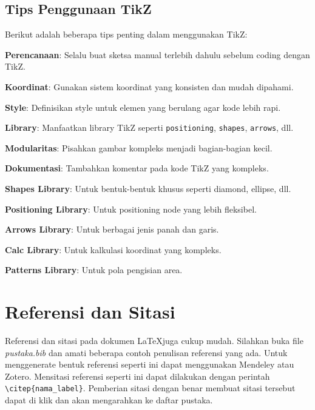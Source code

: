 \subsection{Tips Penggunaan TikZ}
Berikut adalah beberapa tips penting dalam menggunakan TikZ:

\begin{packed_enum}
    \item \textbf{Perencanaan}: Selalu buat sketsa manual terlebih dahulu sebelum coding dengan TikZ.
    \item \textbf{Koordinat}: Gunakan sistem koordinat yang konsisten dan mudah dipahami.
    \item \textbf{Style}: Definisikan style untuk elemen yang berulang agar kode lebih rapi.
    \item \textbf{Library}: Manfaatkan library TikZ seperti \texttt{positioning}, \texttt{shapes}, \texttt{arrows}, dll.
    \item \textbf{Modularitas}: Pisahkan gambar kompleks menjadi bagian-bagian kecil.
    \item \textbf{Dokumentasi}: Tambahkan komentar pada kode TikZ yang kompleks.
\end{packed_enum}

\begin{packed_item}
    \item \textbf{Shapes Library}: Untuk bentuk-bentuk khusus seperti diamond, ellipse, dll.
    \item \textbf{Positioning Library}: Untuk positioning node yang lebih fleksibel.
    \item \textbf{Arrows Library}: Untuk berbagai jenis panah dan garis.
    \item \textbf{Calc Library}: Untuk kalkulasi koordinat yang kompleks.
    \item \textbf{Patterns Library}: Untuk pola pengisian area.
\end{packed_item}

\section{Referensi dan Sitasi}
Referensi dan sitasi pada dokumen \LaTeX juga cukup mudah. Silahkan buka file \textit{pustaka.bib} dan amati beberapa contoh penulisan referensi yang ada. Untuk menggenerate bentuk referensi seperti ini dapat menggunakan Mendeley atau Zotero. Mensitasi referensi seperti ini  dapat dilakukan dengan perintah \verb|\citep{nama_label}|. Pemberian sitasi dengan benar membuat sitasi tersebut dapat di klik dan akan mengarahkan ke daftar pustaka.
